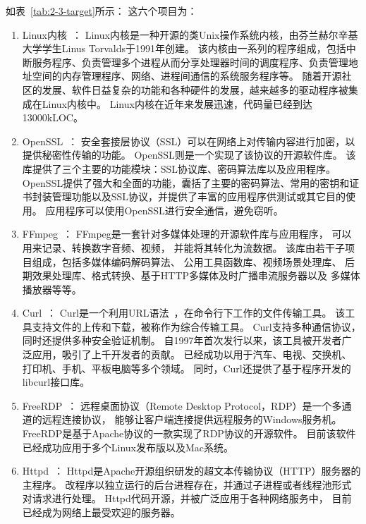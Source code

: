 如表~\ref{tab:2-3-target}所示：
这六个项目为：
\begin{enumerate}
	\item Linux内核~\cite{linux}：
	Linux内核是一种开源的类Unix操作系统内核，由芬兰赫尔辛基大学学生Linus Torvalds于1991年创建。
	该内核由一系列的程序组成，包括中断服务程序、负责管理多个进程从而分享处理器时间的调度程序、负责管理地址空间的内存管理程序、网络、进程间通信的系统服务程序等。
	随着开源社区的发展、软件日益复杂的功能和各种硬件的发展，越来越多的驱动程序被集成在Linux内核中。
	Linux内核在近年来发展迅速，代码量已经到达13000kLOC。
	
	\item OpenSSL~\cite{openssl}：
	安全套接层协议（SSL）可以在网络上对传输内容进行加密，以提供秘密性传输的功能。
	OpenSSL则是一个实现了该协议的开源软件库。
	该库提供了三个主要的功能模块：SSL协议库、密码算法库以及应用程序。
	OpenSSL提供了强大和全面的功能，囊括了主要的密码算法、常用的密钥和证书封装管理功能以及SSL协议，并提供了丰富的应用程序供测试或其它目的使用。
	应用程序可以使用OpenSSL进行安全通信，避免窃听。
	
	
	\item FFmpeg~\cite{ffmpeg}：
	FFmpeg是一套针对多媒体处理的开源软件库与应用程序，
	可以用来记录、转换数字音频、视频，
	并能将其转化为流数据。
	该库由若干子项目组成，包括多媒体编码解码算法、
	公用工具函数库、视频场景处理库、
	后期效果处理库、格式转换、基于HTTP多媒体及时广播串流服务器以及
	多媒体播放器等等。
	
	\item Curl~\cite{curl}：
	Curl是一个利用URL语法~\cite{url}，在命令行下工作的文件传输工具。
	该工具支持文件的上传和下载，被称作为综合传输工具。
	Curl支持多种通信协议，同时还提供多种安全验证机制。
	自1997年首次发行以来，该工具被开发者广泛应用，吸引了上千开发者的贡献。
	已经成功以用于汽车、电视、交换机、打印机、手机、平板电脑等多个领域。
	同时，Curl还提供了基于程序开发的libcurl接口库。
	
	\item FreeRDP~\cite{freerdp}：
	远程桌面协议（Remote Desktop Protocol，RDP）是一个多通道的远程连接协议，
	能够让客户端连接提供远程服务的Windows服务机。
	FreeRDP是基于Apache协议的一款实现了RDP协议的开源软件。
	目前该软件已经成功应用于多个Linux发布版以及Mac系统。
	
	
	\item Httpd~\cite{httpd}：
	Httpd是Apache开源组织研发的超文本传输协议（HTTP）服务器的主程序。
	改程序以独立运行的后台进程存在，并通过子进程或者线程池形式对请求进行处理。
	Httpd代码开源，并被广泛应用于各种网络服务中，
	目前已经成为网络上最受欢迎的服务器。
	
\end{enumerate}

